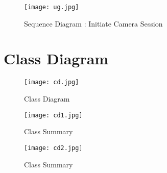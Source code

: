 \documentclass{scrreprt}
\begin{document}
\newpage
\begin{figure}
\centering
\texttt{[image: ug.jpg]}
\caption{Sequence Diagram : Initiate Camera Session}
\end{figure}
\chapter{Class Diagram}

\begin{figure}[h!]
\centering
\texttt{[image: cd.jpg]}
\caption{Class Diagram}
\end{figure}
\newpage
\begin{figure}[h!]
\centering
\texttt{[image: cd1.jpg]}
\caption{Class Summary}
\end{figure}
\newpage
\begin{figure}[h!]
\centering
\texttt{[image: cd2.jpg]}
\caption{Class Summary}
\end{figure}
\end{document}
